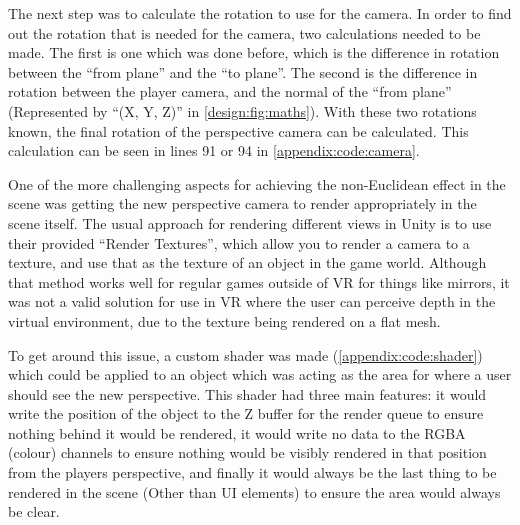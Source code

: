 		The next step was to calculate the rotation to use for the camera.
		In order to find out the rotation that is needed for the camera, two calculations needed to be made.
		The first is one which was done before, which is the difference in rotation between the \enquote{from plane} and the \enquote{to plane}.
		The second is the difference in rotation between the player camera, and the normal of the \enquote{from plane} (Represented by \enquote{(X\degree, Y\degree, Z\degree)} in \autoref{design:fig:maths}).
		With these two rotations known, the final rotation of the perspective camera can be calculated.
		This calculation can be seen in lines 91 or 94 in \autoref{appendix:code:camera}.

		One of the more challenging aspects for achieving the non-Euclidean effect in the scene was getting the new perspective camera to render appropriately in the scene itself.
		The usual approach for rendering different views in Unity is to use their provided \enquote{Render Textures}, which allow you to render a camera to a texture, and use that as the texture of an object in the game world.
		Although that method works well for regular games outside of VR for things like mirrors, it was not a valid solution for use in VR where the user can perceive depth in the virtual environment, due to the texture being rendered on a flat mesh.

		To get around this issue, a custom shader was made (\autoref{appendix:code:shader}) which could be applied to an object which was acting as the area for where a user should see the new perspective.
		This shader had three main features: it would write the position of the object to the Z buffer for the render queue to ensure nothing behind it would be rendered, it would write no data to the RGBA (colour) channels to ensure nothing would be visibly rendered in that position from the players perspective, and finally it would always be the last thing to be rendered in the scene (Other than UI elements) to ensure the area would always be clear.

